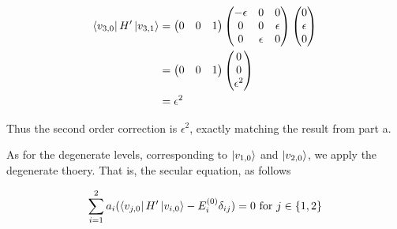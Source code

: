 \begin{alphaparts}
\begin{align}
    \bra{v_{3, 0}} H' \ket{v_{3, 1}} &= \begin{pmatrix}
        0 & 0 & 1
    \end{pmatrix}\begin{pmatrix}
        -\epsilon       & 0         & 0         \\
        0               & 0         & \epsilon  \\
        0               & \epsilon  & 0           
    \end{pmatrix}\begin{pmatrix}
        0 \\ \epsilon \\ 0
    \end{pmatrix}\nonumber\\
    &= \begin{pmatrix}
        0 & 0 & 1
    \end{pmatrix}\begin{pmatrix}
        0 \\ 0 \\ \epsilon^2
    \end{pmatrix}\nonumber\\
    &= \epsilon^2
\end{align}

Thus the second order correction is $\epsilon^2$, exactly matching the result
from part a.

\questionpart
As for the degenerate levels, corresponding to $\ket{v_{1, 0}}$ and $\ket{v_{2,
0}}$, we apply the degenerate thoery. That is, the secular equation, as follows

\begin{equation}
    \sum_{i=1}^2 a_i (\bra{v_{j, 0}} H' \ket{v_{i, 0}} - E_i^{(0)} \delta_{ij}) = 0 \textnormal{ for } j \in \{1, 2\}
\end{equation}

\end{alphaparts}
